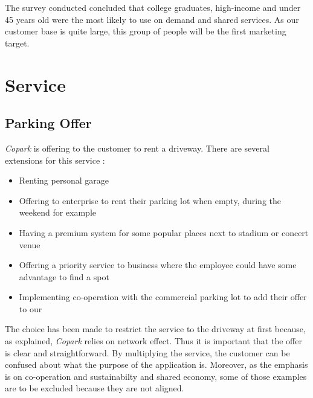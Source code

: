 \documentclass[12pt,a4paper,oneside]{book}
\newcommand{\bp}{\textit{Copark }}
\begin{document}
The survey conducted concluded that college graduates, high-income and under 45 years old were the most likely to use on demand and shared services.\cite{airbnbuse} As our customer base is quite large, this group of people will be the first marketing target.

\section{Service}
\subsection{Parking Offer}
\bp is offering to the customer to rent a driveway. There are several extensions for this service :
\begin{itemize}
\item Renting personal garage
\item Offering to enterprise to rent their parking lot when empty, during the weekend for example
\item Having a premium system for some popular places next to stadium or concert venue
\item Offering a priority service to business where the employee could have some advantage to find a spot
\item Implementing co-operation with the commercial parking lot to add their offer to our
\end{itemize} 
The choice has been made to restrict the service to the driveway at first because, as explained, \bp relies on network effect. Thus it is important that the offer is clear and straightforward. By multiplying the service, the customer can be confused about what the purpose of the application is. Moreover, as the emphasis is on co-operation and sustainabilty and shared economy, some of those examples are to be excluded because they are not aligned.
\end{document}
